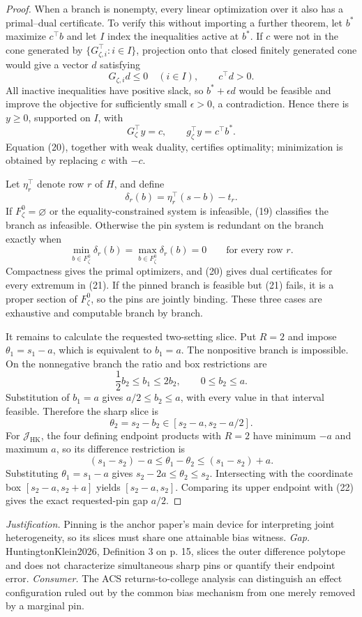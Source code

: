 \documentclass{article}
\begin{document}
\begin{proof}
When a branch is nonempty, every linear optimization over it also has a primal--dual certificate.  To verify this without importing a further theorem, let \(b^*\) maximize \(c^{\top}b\) and let \(I\) index the inequalities active at \(b^*\).  If \(c\) were not in the cone generated by \(\{G_{\zeta,i}^{\top}:i\in I\}\), projection onto that closed finitely generated cone would give a vector \(d\) satisfying
\[
 G_{\zeta,i}d\le0\quad(i\in I),
 \qquad c^{\top}d>0.
\]
All inactive inequalities have positive slack, so \(b^*+\epsilon d\) would be feasible and improve the objective for sufficiently small \(\epsilon>0\), a contradiction.  Hence there is \(y\ge0\), supported on \(I\), with
\[
 G_{\zeta}^{\top}y=c,
 \qquad
 g_{\zeta}^{\top}y=c^{\top}b^*.
\tag{20}
\]
Equation (20), together with weak duality, certifies optimality; minimization is obtained by replacing \(c\) with \(-c\).

Let \(\eta_r^{\top}\) denote row \(r\) of \(H\), and define
\[
 \delta_r(b)=\eta_r^{\top}(s-b)-t_r.
\]
If \(F_{\zeta}^0=\varnothing\) or the equality-constrained system is infeasible, (19) classifies the branch as infeasible.  Otherwise the pin system is redundant on the branch exactly when
\[
 \min_{b\in F_{\zeta}^0}\delta_r(b)
 =\max_{b\in F_{\zeta}^0}\delta_r(b)=0
 \qquad\text{for every row }r.
\tag{21}
\]
Compactness gives the primal optimizers, and (20) gives dual certificates for every extremum in (21).  If the pinned branch is feasible but (21) fails, it is a proper section of \(F_{\zeta}^0\), so the pins are jointly binding.  These three cases are exhaustive and computable branch by branch.

It remains to calculate the requested two-setting slice.  Put \(R=2\) and impose \(\theta_1=s_1-a\), which is equivalent to \(b_1=a\).  The nonpositive branch is impossible.  On the nonnegative branch the ratio and box restrictions are
\[
 \frac12 b_2\le b_1\le2b_2,
 \qquad 0\le b_2\le a.
\]
Substitution of \(b_1=a\) gives \(a/2\le b_2\le a\), with every value in that interval feasible.  Therefore the sharp slice is
\[
 \theta_2=s_2-b_2\in[s_2-a,s_2-a/2].
\tag{22}
\]
For \(\mathcal J_{\mathrm{HK}}\), the four defining endpoint products with \(R=2\) have minimum \(-a\) and maximum \(a\), so its difference restriction is
\[
 (s_1-s_2)-a\le\theta_1-\theta_2\le(s_1-s_2)+a.
\]
Substituting \(\theta_1=s_1-a\) gives \(s_2-2a\le\theta_2\le s_2\).  Intersecting with the coordinate box \([s_2-a,s_2+a]\) yields \([s_2-a,s_2]\).  Comparing its upper endpoint with (22) gives the exact requested-pin gap \(a/2\).
\end{proof}
\par\smallskip\noindent \textit{Justification.} Pinning is the anchor paper's main device for interpreting joint heterogeneity, so its slices must share one attainable bias witness. \textit{Gap.} HuntingtonKlein2026, Definition 3 on p. 15, slices the outer difference polytope and does not characterize simultaneous sharp pins or quantify their endpoint error. \textit{Consumer.} The ACS returns-to-college analysis can distinguish an effect configuration ruled out by the common bias mechanism from one merely removed by a marginal pin.
\end{document}
